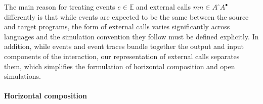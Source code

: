 \documentclass[acmsmall,screen,review,anonymous]{acmart}
\newcommand{\kw}[1]{\ensuremath{ \mathsf{#1} }}
\newcommand{\que}{\circ}
\newcommand{\ans}{\bullet}
\begin{document}
The main reason for treating
events $e \in \mathbb{E}$ and
external calls $m n \in A^\que A^\ans$
differently is that
while events are expected to be the same
between the source and target programs,
the form of external calls varies significantly
across languages
and the simulation convention they follow
must be defined explicitly.
In addition,
while events and event traces
bundle together the output and input
components of the interaction,
our representation of external calls
separates them,
which simplifies the formulation of
horizontal composition and open simulations.



\paragraph{Horizontal composition} \label{sec:sem:linker} %
\end{document}
